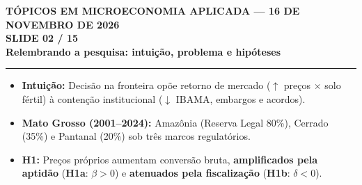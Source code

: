 \documentclass[11pt,a4paper]{article}
\newcommand{\slidenum}{1}
\begin{document}
\newpage

\renewcommand{\slidenum}{2}
\noindent
\begin{minipage}{\textwidth}
\begin{center}
{\color{cinza}\footnotesize\textbf{TÓPICOS EM MICROECONOMIA APLICADA --- 16 DE NOVEMBRO DE 2026}\\[1.2mm]}
{\color{cinza}\bfseries\Large SLIDE 02 / 15\\[1.5mm]}
{\color{verde}\bfseries\LARGE Relembrando a pesquisa: intuição, problema e hipóteses\\[2.5mm]}
\rule{\textwidth}{1pt}
\end{center}
\end{minipage}
\vspace{1.5mm}

\begin{tcolorbox}[title={\bfseries\small ÂNCORAS EMPÍRICAS E CONCEITUAIS DO SLIDE}]
\begin{itemize}[leftmargin=*,itemsep=1mm,topsep=0.5mm]
    \item \textbf{Intuição:} Decisão na fronteira opõe retorno de mercado ($\uparrow$ preços $\times$ solo fértil) à contenção institucional ($\downarrow$ IBAMA, embargos e acordos).
    \item \textbf{Mato Grosso (2001--2024):} Amazônia (Reserva Legal 80\%), Cerrado (35\%) e Pantanal (20\%) sob três marcos regulatórios.
    \item \textbf{H1:} Preços próprios aumentam conversão bruta, \textbf{amplificados pela aptidão} (\textbf{H1a}: $\beta > 0$) e \textbf{atenuados pela fiscalização} (\textbf{H1b}: $\delta < 0$).
\end{itemize}
\end{tcolorbox}
\vspace{2mm}
\end{document}
